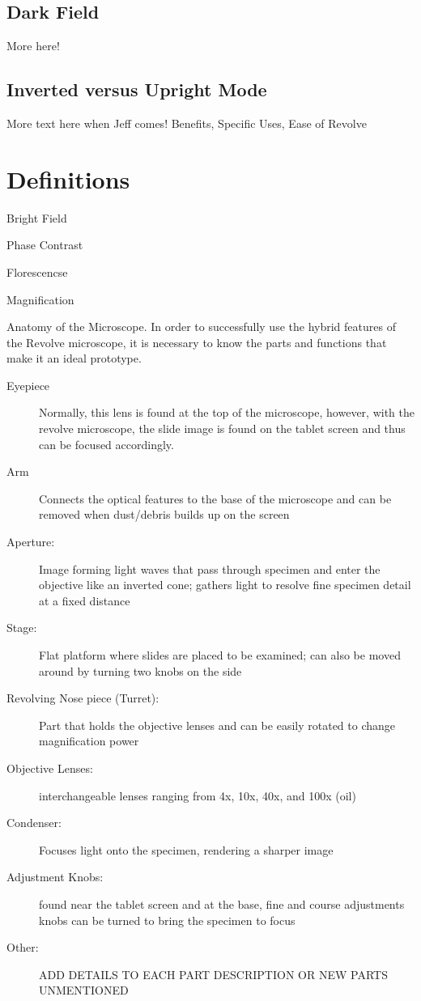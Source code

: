 \documentclass[12pt]{../SOP3_beta}
\begin{document}
\subsection*{Dark Field}

\NP More here!

\subsection*{Inverted versus Upright Mode}

More text here when Jeff comes!
Benefits, Specific Uses, Ease of Revolve

\section{Definitions}

\NP Bright Field

\NP Phase Contrast

\NP Florescencse

\NP Magnification

\NP Anatomy of the Microscope. In order to successfully use the hybrid features of the Revolve microscope, it is necessary to know the parts and functions that make it an ideal prototype.

\begin{description}
  \item[Eyepiece] Normally, this lens is found  at the top of the microscope, however, with the revolve microscope, the slide image is found on the tablet screen and thus can be focused accordingly.
  \item[Arm] Connects the optical features to the base of the microscope and can be removed when dust/debris builds up on the screen 
  \item[Aperture:] Image forming light waves that pass through specimen and enter the objective like an inverted cone; gathers light to resolve fine specimen detail at a fixed distance
  \item[Stage:] Flat platform where slides are placed to be examined; can also be moved around by turning two knobs on the side 
  \item[Revolving Nose piece (Turret):] Part that holds the objective lenses and can be easily rotated to change magnification power
  \item[Objective Lenses:] interchangeable lenses ranging from 4x, 10x, 40x, and 100x (oil)
  \item[Condenser:] Focuses light onto the specimen, rendering a sharper image
  \item[Adjustment Knobs:] found near the tablet screen and at the base, fine and course adjustments knobs can be turned to bring the specimen to focus 

\item[Other:] ADD DETAILS TO EACH PART DESCRIPTION OR NEW PARTS UNMENTIONED 

\end{description}
\end{document}
